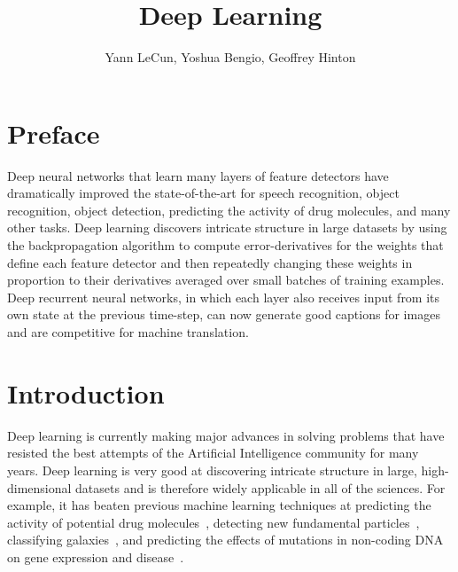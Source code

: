 \documentclass[]{article}
\title{Deep Learning}
\author{Yann LeCun, Yoshua Bengio, Geoffrey Hinton}
\begin{document}
\maketitle

\section{Preface}

Deep neural networks that learn many layers of feature detectors have
dramatically improved the state-of-the-art for speech recognition, object
recognition, object detection, predicting the activity of drug molecules,
and many other tasks. Deep learning discovers intricate structure in large
datasets by using the backpropagation algorithm to compute
error-derivatives for the weights that define each feature detector and
then repeatedly changing these weights in proportion to their derivatives
averaged over small batches of training examples.  Deep recurrent neural
networks, in which each layer also receives input from its own state at the
previous time-step, can now generate good captions for images and are
competitive for machine translation.

\section{Introduction}

Deep learning is currently making major advances in solving problems that
have resisted the best attempts of the Artificial Intelligence community
for many years. Deep learning is very good at discovering intricate
structure in large, high-dimensional datasets and is therefore widely
applicable in all of the sciences. For example, it has beaten previous
machine learning techniques at predicting the activity of potential drug
molecules~\citep{Dahl}, detecting new fundamental particles~\citep{particles},
classifying galaxies~\citep{??}, and predicting the effects of mutations in
non-coding DNA on gene expression and disease~\citep{Frey}.
\end{document}
